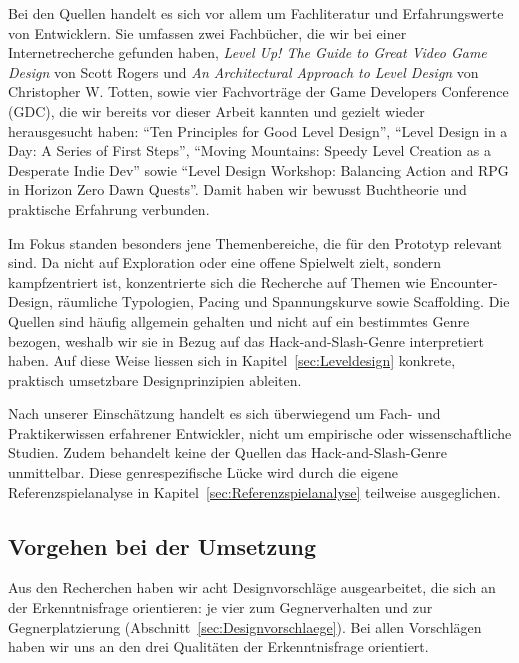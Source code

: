 \documentclass[../Main.tex]{subfiles}
\begin{document}
Bei den Quellen handelt es sich vor allem um Fachliteratur und Erfahrungswerte von Entwicklern. Sie umfassen zwei Fachbücher, die wir bei einer Internetrecherche gefunden haben, \textit{Level Up! The Guide to Great Video Game Design} von Scott Rogers\autocite{rogers2014levelup} und \textit{An Architectural Approach to Level Design} von Christopher W. Totten\autocite{totten2014architectural}, sowie vier Fachvorträge der Game Developers Conference (GDC), die wir bereits vor dieser Arbeit kannten und gezielt wieder herausgesucht haben: \enquote{Ten Principles for Good Level Design}\autocite{gdc_tenprinciples2010}, \enquote{Level Design in a Day: A Series of First Steps}\autocite{gdc_leveldesignaday2020}, \enquote{Moving Mountains: Speedy Level Creation as a Desperate Indie Dev}\autocite{gdc_movingmountains2020} sowie \enquote{Level Design Workshop: Balancing Action and RPG in Horizon Zero Dawn Quests}\autocite{gdc_horizonquests2018}. Damit haben wir bewusst Buchtheorie und praktische Erfahrung verbunden.

Im Fokus standen besonders jene Themenbereiche, die für den Prototyp relevant sind. Da  nicht auf Exploration oder eine offene Spielwelt zielt, sondern kampfzentriert ist, konzentrierte sich die Recherche auf Themen wie Encounter-Design, räumliche Typologien, Pacing und Spannungskurve sowie Scaffolding. Die Quellen sind häufig allgemein gehalten und nicht auf ein bestimmtes Genre bezogen, weshalb wir sie in Bezug auf das Hack-and-Slash-Genre interpretiert haben. Auf diese Weise liessen sich in Kapitel~\ref{sec:Leveldesign} konkrete, praktisch umsetzbare Designprinzipien ableiten.

Nach unserer Einschätzung handelt es sich überwiegend um Fach- und Praktikerwissen erfahrener Entwickler, nicht um empirische oder wissenschaftliche Studien. Zudem behandelt keine der Quellen das Hack-and-Slash-Genre unmittelbar. Diese genrespezifische Lücke wird durch die eigene Referenzspielanalyse in Kapitel~\ref{sec:Referenzspielanalyse} teilweise ausgeglichen.

\subsection{Vorgehen bei der Umsetzung} \label{sec:VorgehenUmsetzung}
Aus den Recherchen haben wir acht Designvorschläge ausgearbeitet, die sich an der Erkenntnisfrage orientieren: je vier zum Gegnerverhalten und zur Gegnerplatzierung (Abschnitt~\ref{sec:Designvorschlaege}). Bei allen Vorschlägen haben wir uns an den drei Qualitäten der Erkenntnisfrage orientiert.
\end{document}
